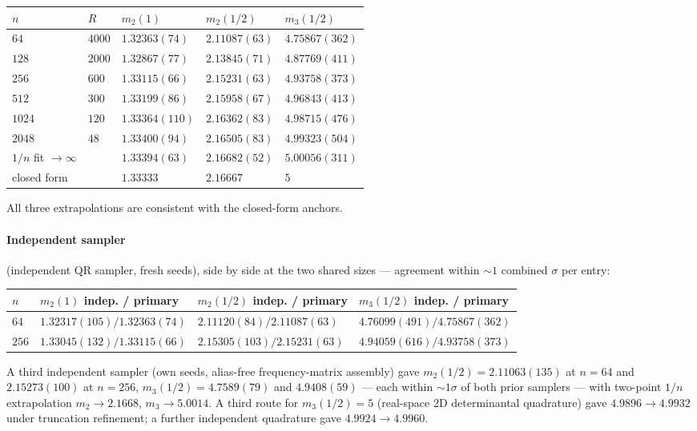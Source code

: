 \documentclass[11pt]{article}
\theoremstyle{plain}
\theoremstyle{definition}
\theoremstyle{remark}
\begin{document}
\begin{table}[h]
\centering
\begin{tabular}{@{}lllll@{}}
\toprule
$n$ & $R$ & $m_2(1)$ & $m_2(1/2)$ & $m_3(1/2)$ \\
\midrule
$64$ & $4000$ & $1.32363(74)$ & $2.11087(63)$ & $4.75867(362)$ \\
$128$ & $2000$ & $1.32867(77)$ & $2.13845(71)$ & $4.87769(411)$ \\
$256$ & $600$ & $1.33115(66)$ & $2.15231(63)$ & $4.93758(373)$ \\
$512$ & $300$ & $1.33199(86)$ & $2.15958(67)$ & $4.96843(413)$ \\
$1024$ & $120$ & $1.33364(110)$ & $2.16362(83)$ & $4.98715(476)$ \\
$2048$ & $48$ & $1.33400(94)$ & $2.16505(83)$ & $4.99323(504)$ \\
\addlinespace
$1/n$ fit $\to \infty$ & & $1.33394(63)$ & $2.16682(52)$ & $5.00056(311)$ \\
closed form & & $1.33333$ & $2.16667$ & $5$ \\
\bottomrule
\end{tabular}
\end{table}

All three extrapolations are consistent with the closed-form anchors.

\paragraph{Independent sampler}
(independent QR sampler, fresh seeds), side by side at the two shared sizes ---
agreement within ${\sim}1$ combined $\sigma$ per entry:

\begin{table}[h]
\centering
\begin{tabular}{@{}llll@{}}
\toprule
$n$ & $m_2(1)$ indep. / primary & $m_2(1/2)$ indep. / primary &
$m_3(1/2)$ indep. / primary \\
\midrule
$64$ & $1.32317(105) / 1.32363(74)$ & $2.11120(84) / 2.11087(63)$ &
$4.76099(491) / 4.75867(362)$ \\
$256$ & $1.33045(132) / 1.33115(66)$ & $2.15305(103) / 2.15231(63)$ &
$4.94059(616) / 4.93758(373)$ \\
\bottomrule
\end{tabular}
\end{table}

A third independent sampler (own seeds, alias-free
frequency-matrix assembly) gave $m_2(1/2) = 2.11063(135)$ at $n = 64$ and
$2.15273(100)$ at $n = 256$, $m_3(1/2) = 4.7589(79)$ and $4.9408(59)$ --- each
within ${\sim}1\sigma$ of both prior samplers --- with two-point $1/n$
extrapolation $m_2 \to 2.1668$, $m_3 \to 5.0014$. A third route for
$m_3(1/2) = 5$ (real-space 2D determinantal quadrature) gave
$4.9896 \to 4.9932$ under truncation refinement; a further independent
quadrature gave $4.9924 \to 4.9960$.
\end{document}
